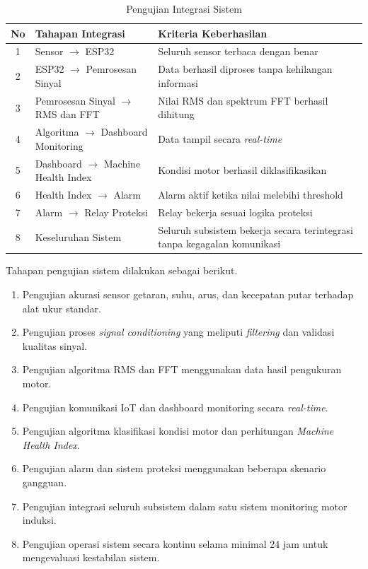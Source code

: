 \documentclass{elsinta}
\begin{document}
\begin{table}[H]
\centering
\caption{Pengujian Integrasi Sistem}
\label{tab:integrasi_sistem}

\begin{tabular}{|c|p{6cm}|p{7cm}|}
\hline
\textbf{No} &
\centering\textbf{Tahapan Integrasi} &
\centering\arraybackslash\textbf{Kriteria Keberhasilan}\\
\hline

1 &
Sensor $\rightarrow$ ESP32 &
Seluruh sensor terbaca dengan benar\\
\hline

2 &
ESP32 $\rightarrow$ Pemrosesan Sinyal &
Data berhasil diproses tanpa kehilangan informasi\\
\hline

3 &
Pemrosesan Sinyal $\rightarrow$ RMS dan FFT &
Nilai RMS dan spektrum FFT berhasil dihitung\\
\hline

4 &
Algoritma $\rightarrow$ Dashboard Monitoring &
Data tampil secara \textit{real-time}\\
\hline

5 &
Dashboard $\rightarrow$ Machine Health Index &
Kondisi motor berhasil diklasifikasikan\\
\hline

6 &
Health Index $\rightarrow$ Alarm &
Alarm aktif ketika nilai melebihi threshold\\
\hline

7 &
Alarm $\rightarrow$ Relay Proteksi &
Relay bekerja sesuai logika proteksi\\
\hline

8 &
Keseluruhan Sistem &
Seluruh subsistem bekerja secara terintegrasi tanpa kegagalan komunikasi\\
\hline

\end{tabular}
\end{table}

Tahapan pengujian sistem dilakukan sebagai berikut.

\begin{enumerate}
\item Pengujian akurasi sensor getaran, suhu, arus, dan kecepatan putar terhadap alat ukur standar.
\item Pengujian proses \textit{signal conditioning} yang meliputi \textit{filtering} dan validasi kualitas sinyal.
\item Pengujian algoritma RMS dan FFT menggunakan data hasil pengukuran motor.
\item Pengujian komunikasi IoT dan dashboard monitoring secara \textit{real-time}.
\item Pengujian algoritma klasifikasi kondisi motor dan perhitungan \textit{Machine Health Index}.
\item Pengujian alarm dan sistem proteksi menggunakan beberapa skenario gangguan.
\item Pengujian integrasi seluruh subsistem dalam satu sistem monitoring motor induksi.
\item Pengujian operasi sistem secara kontinu selama minimal 24 jam untuk mengevaluasi kestabilan sistem.
\end{enumerate} 
\end{document}

